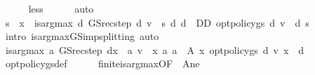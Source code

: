 \begin{isabellebody}
\ \ \ \ \isamarkupfalse%
\ less\isanewline
\ \ \ \ \isamarkupfalse%
\ auto\isanewline
\ \ \isamarkupfalse%
\ {\isacharasterisk}{\kern0pt}{\isacharcolon}{\kern0pt}{\isachardoublequoteopen}s\ {\isacharless}{\kern0pt}\ x\ {\isasymLongrightarrow}\ is{\isacharunderscore}{\kern0pt}arg{\isacharunderscore}{\kern0pt}max\ {\isacharparenleft}{\kern0pt}{\isasymlambda}d{\isachardot}{\kern0pt}\ GS{\isacharunderscore}{\kern0pt}rec{\isacharunderscore}{\kern0pt}step\ d\ v\ {\isachardollar}{\kern0pt}\ s{\isacharparenright}{\kern0pt}\ {\isacharparenleft}{\kern0pt}{\isasymlambda}d{\isachardot}{\kern0pt}\ d\ {\isasymin}\ D\isactrlsub D{\isacharparenright}{\kern0pt}\ {\isacharparenleft}{\kern0pt}opt{\isacharunderscore}{\kern0pt}policy{\isacharunderscore}{\kern0pt}gs{\isacharprime}{\kern0pt}\ d\ v{\isacharparenright}{\kern0pt}{\isachardoublequoteclose}\ \ d\ s\isanewline
\ \ \ \ \isamarkupfalse%
\ {\isacharparenleft}{\kern0pt}intro\ is{\isacharunderscore}{\kern0pt}arg{\isacharunderscore}{\kern0pt}max{\isacharunderscore}{\kern0pt}GS{\isacharunderscore}{\kern0pt}imp{\isacharunderscore}{\kern0pt}splitting{\isacharprime}{\kern0pt}{\isacharprime}{\kern0pt}{\isacharprime}{\kern0pt}{\isacharparenright}{\kern0pt}\ auto\isanewline
\ \ \isamarkupfalse%
\ {\isachardoublequoteopen}is{\isacharunderscore}{\kern0pt}arg{\isacharunderscore}{\kern0pt}max\ {\isacharparenleft}{\kern0pt}{\isasymlambda}a{\isachardot}{\kern0pt}\ GS{\isacharunderscore}{\kern0pt}rec{\isacharunderscore}{\kern0pt}step\ {\isacharparenleft}{\kern0pt}d{\isacharparenleft}{\kern0pt}x\ {\isacharcolon}{\kern0pt}{\isacharequal}{\kern0pt}\ a{\isacharparenright}{\kern0pt}{\isacharparenright}{\kern0pt}\ v\ {\isachardollar}{\kern0pt}\ x{\isacharparenright}{\kern0pt}\ {\isacharparenleft}{\kern0pt}{\isasymlambda}a{\isachardot}{\kern0pt}\ a\ {\isasymin}\ A\ x{\isacharparenright}{\kern0pt}\ {\isacharparenleft}{\kern0pt}opt{\isacharunderscore}{\kern0pt}policy{\isacharunderscore}{\kern0pt}gs{\isacharprime}{\kern0pt}\ d\ v\ x{\isacharparenright}{\kern0pt}{\isachardoublequoteclose}\ \ d\isanewline
\ \ \ \ \isamarkupfalse%
\ opt{\isacharunderscore}{\kern0pt}policy{\isacharunderscore}{\kern0pt}gs{\isacharprime}{\kern0pt}{\isacharunderscore}{\kern0pt}def\isanewline
\ \ \ \ \isamarkupfalse%
\ finite{\isacharunderscore}{\kern0pt}is{\isacharunderscore}{\kern0pt}arg{\isacharunderscore}{\kern0pt}max{\isacharbrackleft}{\kern0pt}OF\ {\isacharunderscore}{\kern0pt}\ A{\isacharunderscore}{\kern0pt}ne{\isacharbrackright}{\kern0pt}\isanewline

\end{isabellebody}
